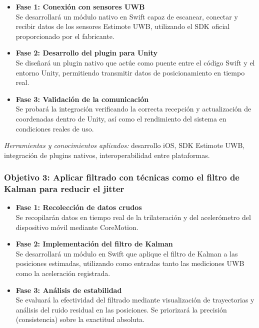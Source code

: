 \documentclass{article}
\begin{document}
\begin{itemize}
    \item \textbf{Fase 1: Conexión con sensores UWB} \\
    Se desarrollará un módulo nativo en Swift capaz de escanear, conectar y recibir datos de los sensores Estimote UWB, utilizando el SDK oficial proporcionado por el fabricante.

    \item \textbf{Fase 2: Desarrollo del plugin para Unity} \\
    Se diseñará un plugin nativo que actúe como puente entre el código Swift y el entorno Unity, permitiendo transmitir datos de posicionamiento en tiempo real.

    \item \textbf{Fase 3: Validación de la comunicación} \\
    Se probará la integración verificando la correcta recepción y actualización de coordenadas dentro de Unity, así como el rendimiento del sistema en condiciones reales de uso.
\end{itemize}

\textit{Herramientas y conocimientos aplicados:} desarrollo iOS, SDK Estimote UWB, integración de plugins nativos, interoperabilidad entre plataformas.

\subsubsection{Objetivo 3: Aplicar filtrado con técnicas como el filtro de Kalman para reducir el jitter}

\begin{itemize}
    \item \textbf{Fase 1: Recolección de datos crudos} \\
    Se recopilarán datos en tiempo real de la trilateración y del acelerómetro del dispositivo móvil mediante CoreMotion.

    \item \textbf{Fase 2: Implementación del filtro de Kalman} \\
    Se desarrollará un módulo en Swift que aplique el filtro de Kalman a las posiciones estimadas, utilizando como entradas tanto las mediciones UWB como la aceleración registrada.

    \item \textbf{Fase 3: Análisis de estabilidad} \\
    Se evaluará la efectividad del filtrado mediante visualización de trayectorias y análisis del ruido residual en las posiciones. Se priorizará la precisión (consistencia) sobre la exactitud absoluta.
\end{itemize}
\end{document}
